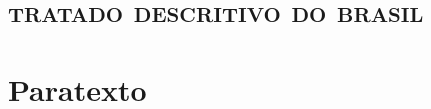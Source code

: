 


\part[tratado descritivo do brasil]{\textsc{tratado descritivo do brasil}} 





\part{Paratexto}

